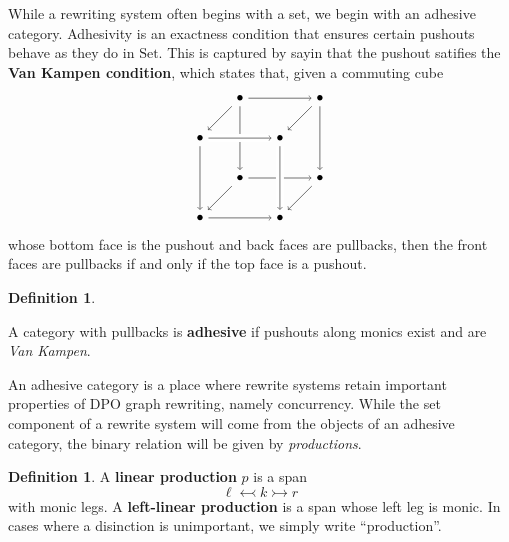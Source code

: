 \documentclass{amsart}
\newcommand{\Set}{\cat{Set}}
\newcommand{\defn}[1]{\textbf{#1}}
\newcommand{\cat}[1]{\mathrm{#1}}
\theoremstyle{remark}
\theoremstyle{definition}
\newtheorem{definition}[theorem]{Definition}
\begin{document}
While a rewriting system often begins with a set, we begin with an
adhesive category.  Adhesivity is an exactness condition that ensures
certain pushouts behave as they do in $ \Set $. This is captured by
sayin that the pushout satifies the \defn{Van Kampen condition}, which
states that, given a commuting cube
%
\[
  \begin{tikzpicture}
    \node (1) at (1,3) {\( \bullet \)};
    \node (2) at (0,2) {\( \bullet \)};
    \node (3) at (3,3) {\( \bullet \)};
    \node (4) at (2,2) {\( \bullet \)};
    \node (5) at (1,1) {\( \bullet \)};
    \node (6) at (0,0) {\( \bullet \)};
    \node (7) at (3,1) {\( \bullet \)};
    \node (8) at (2,0) {\( \bullet \)};
    \draw [->] (1) to node [] {\scriptsize{\(  \)}} (5);
    \draw [->] (1) to node [] {\scriptsize{\(  \)}} (2);
    \draw [->] (1) to node [] {\scriptsize{\(  \)}} (3);
    \draw [white, line width=2mm] (2) -- (4);
    \draw [->] (2) to node [] {\scriptsize{\(  \)}} (4);
    \draw [->] (3) to node [] {\scriptsize{\(  \)}} (4);
    \draw [->] (5) to node [] {\scriptsize{\(  \)}} (6);
    \draw [->] (5) to node [] {\scriptsize{\(  \)}} (7);
    \draw [->] (6) to node [] {\scriptsize{\(  \)}} (8);
    \draw [->] (7) to node [] {\scriptsize{\(  \)}} (8);
    \draw [->] (2) to node [] {\scriptsize{\(  \)}} (6);
    \draw [->] (3) to node [] {\scriptsize{\(  \)}} (7);
    \draw [white, line width=2mm] (4) -- (8);
    \draw [->] (4) to node [] {\scriptsize{\(  \)}} (8);
  \end{tikzpicture}
\]
% 
whose bottom face is the pushout and back faces are pullbacks, then
the front faces are pullbacks if and only if the top face is a pushout.

\begin{definition} \label{dfn:adhesive-category} 

  A category with pullbacks is \defn{adhesive} if pushouts along
  monics exist and are \emph{Van Kampen}.

\end{definition} 

An adhesive category is a place where rewrite systems
retain important properties of DPO graph rewriting, namely
concurrency.
%
%
While the set component of a rewrite system will come from the objects
of an adhesive category, the binary relation will be given by
\emph{productions}.

\begin{definition}

  A \defn{linear production} $ p $ is a span
  \[
    \ell \leftarrowtail k \rightarrowtail r
  \]
  with monic legs.  A \defn{left-linear production} is a span whose
  left leg is monic. In cases where a disinction is unimportant, we
  simply write ``production''. 
  
\end{definition}
\end{document}
